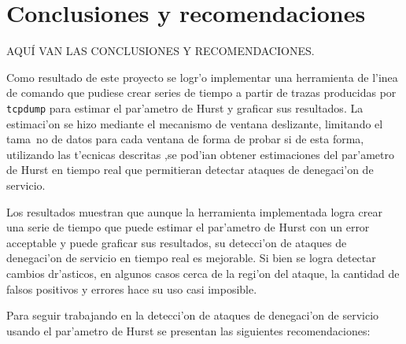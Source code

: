 \chapter{Conclusiones y recomendaciones} \label{chap:conclusiones}

AQU\'I VAN LAS CONCLUSIONES Y RECOMENDACIONES.
\vspace{5 mm}

Como resultado de este proyecto se logr'o implementar una herramienta de
l'inea de comando que pudiese crear series de tiempo a partir de trazas
producidas por {\tt tcpdump} para estimar el par'ametro de Hurst y graficar sus
resultados. La estimaci'on se hizo mediante el mecanismo de ventana deslizante,
limitando el tama~no de datos para cada ventana de forma de probar si de esta
forma, utilizando las t'ecnicas descritas ,se pod'ian obtener estimaciones del
par'ametro de Hurst en tiempo real que permitieran detectar ataques de
denegaci'on de servicio.

Los resultados muestran que aunque la herramienta implementada logra
crear una serie de tiempo que puede estimar el par'ametro de Hurst con un
error acceptable y puede graficar sus resultados, su detecci'on de ataques
de denegaci'on de servicio en tiempo real es mejorable. Si bien se logra
detectar cambios dr'asticos, en algunos casos cerca de la regi'on del ataque,
la cantidad de falsos positivos y errores hace su uso casi imposible. 

Para seguir trabajando en la detecci'on de ataques de denegaci'on de servicio
usando el par'ametro de Hurst se presentan las siguientes recomendaciones: 

